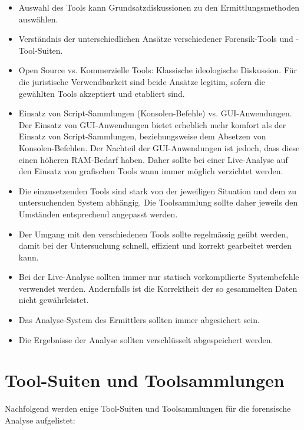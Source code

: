 \begin{itemize}
\item Auswahl des Tools kann Grundsatzdiskussionen zu den Ermittlungsmethoden auswählen.
\item Verständnis der unterschiedlichen Ansätze verschiedener Forensik-Tools und -Tool-Suiten.
\item Open Source vs. Kommerzielle Tools: Klassische ideologische Diskussion. Für die juristische Verwendbarkeit sind beide Ansätze legitim, sofern die gewählten Tools akzeptiert und etabliert sind.
\item Einsatz von Script-Sammlungen (Konsolen-Befehle) vs. GUI-Anwendungen. Der Einsatz von GUI-Anwendungen bietet erheblich mehr komfort als der Einsatz von Script-Sammlungen, beziehungsweise dem Absetzen von Konsolen-Befehlen. Der Nachteil der GUI-Anwendungen ist jedoch, dass diese einen höheren RAM-Bedarf haben. Daher sollte bei einer Live-Analyse auf den Einsatz von grafischen Tools wann immer möglich verzichtet werden.
\item Die einzusetzenden Tools sind stark von der jeweiligen Situation und dem zu untersuchenden System abhängig. Die Toolsammlung sollte daher jeweils den Umständen entsprechend angepasst werden.
\item Der Umgang mit den verschiedenen Tools sollte regelmässig geübt werden, damit bei der Untersuchung schnell, effizient und korrekt gearbeitet werden kann.
\item Bei der Live-Analyse sollten immer nur statisch vorkompilierte Systembefehle verwendet werden. Andernfalls ist die Korrektheit der so gesammelten Daten nicht gewährleistet.
\item Das Analyse-System des Ermittlers sollten immer abgesichert sein.
\item Die Ergebnisse der Analyse sollten verschlüsselt abgespeichert werden.
\end{itemize}



\section{Tool-Suiten und Toolsammlungen}
Nachfolgend werden enige Tool-Suiten und Toolsammlungen für die forensische Analyse aufgelistet:

